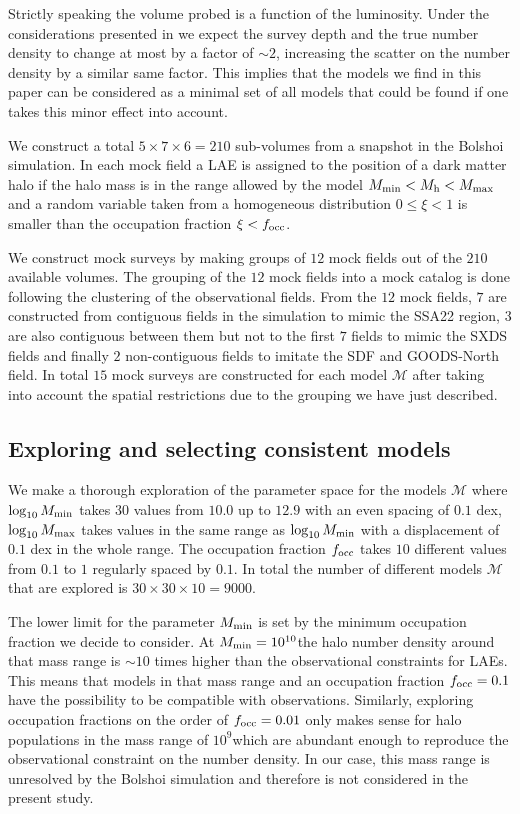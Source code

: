 \documentclass{emulateapj}
\newcommand{\ly}{{\ifmmode{{\rm Ly}\alpha}\else{Ly$\alpha$~}\fi}}
\newcommand{\hMsun}{{\ifmmode{h^{-1}{\rm
        {M_{\odot}}}}\else{$h^{-1}{\rm{M_{\odot}}}$}\fi}}
\begin{document}
Strictly speaking the volume probed is a function of the \ly
luminosity. Under the considerations presented in \citep{Gronwall07}
we expect the survey depth and the true number density to change at
most by a factor of $\sim2$, increasing the scatter on the
number density by a similar same factor. This implies that the models we
find in this paper can be considered as a minimal set of all models
that could be found if one takes this minor effect into account.

We construct a total $5\times 7 \times 6=210$ sub-volumes from a snapshot in the Bolshoi
simulation. In each mock field a LAE is assigned to the position of a
dark matter halo if the halo mass is in the range allowed by the model
$M_{\rm min}<M_{\rm h}<M_{\rm max}$ and a random variable taken from a
homogeneous distribution $0\leq \xi<1$ is smaller than the occupation
fraction $\xi<f_{\rm occ}$. 

We construct mock surveys by making groups of $12$ mock fields
out of the $210$ available volumes.  The grouping of the $12$
mock fields into a mock catalog is done following the clustering of the
observational fields. From the $12$ mock fields, $7$ are constructed
from contiguous fields in the simulation to mimic the SSA22 region,
$3$ are also contiguous between them but not to the first $7$ fields
to mimic the SXDS fields and finally $2$ non-contiguous fields to
imitate the SDF and GOODS-North field.   In total $15$ mock surveys are
constructed for each model $\mathcal{M}$ after taking into account the
spatial restrictions due to the grouping we have just described.

\subsection{Exploring and selecting consistent models}

We make a thorough exploration of the parameter space for the models
${\mathcal M}$ where $\log_{10} M_{\rm min}$ takes $30$ values from $10.0$ up
to $12.9$ with an even spacing of $0.1$ dex, $\log_{10} M_{\rm max}$
takes values in the same range as $\log_{10}M_{\rm min}$ with a
displacement of $0.1$ dex in the whole range. The occupation fraction
$f_{\rm occ}$ takes $10$ different values from $0.1$ to $1$ regularly
spaced by $0.1$. In total the number of different models ${\mathcal
  M}$ that are explored is $30 \times 30 \times 10 = 9000$.  

The lower limit for the parameter $M_{\rm min}$ is set by the minimum
occupation fraction we decide to consider. At $M_{\rm
  min}=10^{10}$\hMsun the halo number density around that mass range
is $\sim 10$ times higher than the observational constraints
for LAEs. This means that models in that mass range and an occupation
fraction $f_{\rm  occ}=0.1$ have the possibility to be compatible with
observations.  Similarly, exploring occupation fractions on the order
of $f_{\rm occ}=0.01$ only makes sense for halo populations in the
mass range of $10^{9}$\hMsun which are abundant enough to reproduce
the observational constraint on the number density. In our case, this
 mass range is unresolved by the Bolshoi simulation and therefore
is not considered in the present study. 
\end{document}

